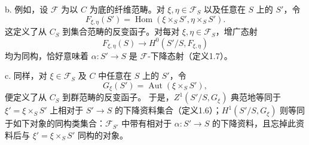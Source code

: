 b. 例如，设 $\mathcal F$ 为以 $C$ 为底的纤维范畴。对 $\xi,\eta\in\mathcal F_S$ 以及任意在 $S$ 上的 $S'$，令
\[
F_{\xi,\eta}(S')=
\operatorname{Hom}(\xi\times_SS',\eta\times_SS').
\]
这定义了从 $C_S$ 到集合范畴的反变函子。对每对 $\xi,\eta\in\mathcal F_S$，增广态射
\[
F_{\xi,\eta}(S)\longrightarrow H^0(S'/S,F_{\xi,\eta})
\]
均为同构，恰好意味着 $\alpha:S'\to S$ 是 $\mathcal F$-下降态射（定义1.7）。

c. 同样，对 $\xi\in\mathcal F_S$ 及 $C$ 中任意在 $S$ 上的 $S'$，令
\[
G_\xi(S')=\operatorname{Aut}(\xi\times_SS'),
\]
便定义了从 $C_S$ 到群范畴的反变函子。
于是，$Z^1(S'/S,G_\xi)$ 典范地等同于 $\xi'=\xi\times_SS'$ 上相对于 $S'\to S$ 的下降资料集合（定义1.6）；$H^1(S'/S,G_\xi)$ 则等同于如下对象的同构类集合：$\mathcal F_{S'}$ 中带有相对于 $\alpha:S'\to S$ 的下降资料，且忘掉此资料后与 $\xi'=\xi\times_SS'$ 同构的对象。


